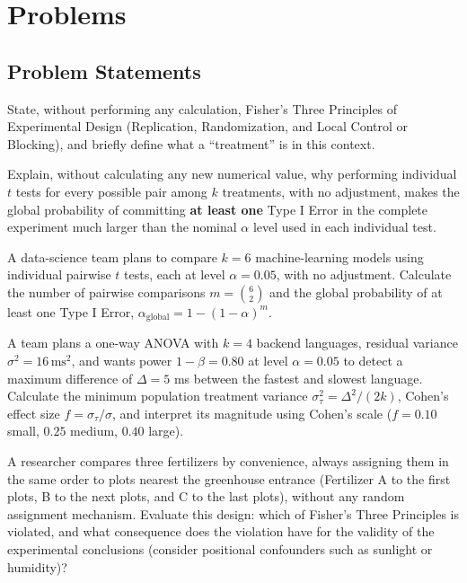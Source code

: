 \section*{Problems}

\subsection*{Problem Statements}

\begin{problema}
\label{prob:8d16ad2}
State, without performing any calculation, Fisher's Three Principles of Experimental Design (Replication, Randomization, and Local Control or Blocking), and briefly define what a ``treatment'' is in this context.
\end{problema}

\begin{problema}
\label{prob:0b5e19a}
Explain, without calculating any new numerical value, why performing individual $t$ tests for every possible pair among $k$ treatments, with no adjustment, makes the global probability of committing \textbf{at least one} Type I Error in the complete experiment much larger than the nominal $\alpha$ level used in each individual test.
\end{problema}

\begin{problema}
\label{prob:433c810}
A data-science team plans to compare $k=6$ machine-learning models using individual pairwise $t$ tests, each at level $\alpha=0.05$, with no adjustment. Calculate the number of pairwise comparisons $m=\binom{6}{2}$ and the global probability of at least one Type I Error, $\alpha_{\text{global}}=1-(1-\alpha)^m$.
\end{problema}

\begin{problema}
\label{prob:9bff013}
A team plans a one-way ANOVA with $k=4$ backend languages, residual variance $\sigma^2=16\,\text{ms}^2$, and wants power $1-\beta=0.80$ at level $\alpha=0.05$ to detect a maximum difference of $\Delta=5$ ms between the fastest and slowest language. Calculate the minimum population treatment variance $\sigma_\tau^2=\Delta^2/(2k)$, Cohen's effect size $f=\sigma_\tau/\sigma$, and interpret its magnitude using Cohen's scale ($f=0.10$ small, $0.25$ medium, $0.40$ large).
\end{problema}

\begin{problema}
\label{prob:257933a}
A researcher compares three fertilizers by convenience, always assigning them in the same order to plots nearest the greenhouse entrance (Fertilizer A to the first plots, B to the next plots, and C to the last plots), without any random assignment mechanism. Evaluate this design: which of Fisher's Three Principles is violated, and what consequence does the violation have for the validity of the experimental conclusions (consider positional confounders such as sunlight or humidity)?
\end{problema}

